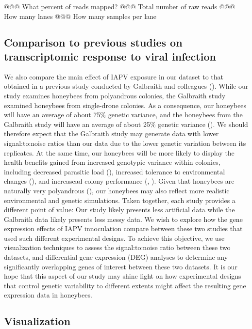 \documentclass[11pt,a4paper,oldfontcommands,openany]{memoir}
\numberwithin{equation}{section} %
\begin{document}
@@@ What percent of reads mapped?
@@@ Total number of raw reads
@@@ How many lanes
@@@ How many samples per lane

\subsection{Comparison to previous studies on transcriptomic response to viral infection}

We also compare the main effect of IAPV exposure in our dataset to that obtained in a previous study conducted by Galbraith and colleagues (\citealt{galbraith}). While our study examines honeybees from polyandrous colonies, the Galbraith study examined honeybees from single-drone colonies. As a consequence, our honeybees will have an average of about 75\% genetic variance, and the honeybees from the Galbraith study will have an average of about 25\% genetic variance (\citealt{sisters}). We should therefore expect that the Galbraith study may generate data with lower signal:to:noise ratios than our data due to the lower genetic variation between its replicates. At the same time, our honeybees will be more likely to display the health benefits gained from increased genotypic variance within colonies, including decreased parasitic load (\citealt{multParasite}), increased tolerance to environmental changes (\citealt{divHyp2}), and increasead colony performance (\citealt{geneticDiverse}, \citealt{geneticDiverse2}). Given that honeybees are naturally very polyandrous (\citealt{patriline}), our honeybees may also reflect more realistic environmental and genetic simulations. Taken together, each study provides a different point of value: Our study likely presents less artificial data while the Galbraith data likely presents less messy data. We wish to explore how the gene expression effects of IAPV innoculation compare between these two studies that used such different experimental designs. To achieve this objective, we use visualization techniques to assess the signal:to:noise ratio between these two datasets, and differential gene expression (DEG) analyses to determine any significantly overlapping genes of interest between these two datasets. It is our hope that this aspect of our study may shine light on how experimental designs that control genetic variability to different extents might affect the resulting gene expression data in honeybees.

\subsection{Visualization}
\end{document}

